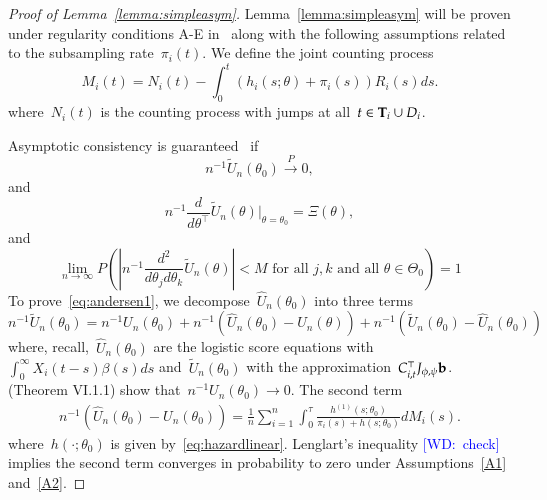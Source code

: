 \documentclass[12pt]{amsart}
\newcommand{\walt}[1]{\textcolor{blue}{[WD:\ #1]}}
\def\bfT{{\bf T}}
\begin{document}
\begin{proof}[Proof of Lemma~\ref{lemma:simpleasym}]
Lemma~\ref{lemma:simpleasym} will be proven under regularity
conditions A-E in~\cite[pp. 420--421]{Andersen1993} along with the
following assumptions related to the subsampling rate~$\pi_i (t)$.
We define the joint counting process
\[
M_i (t) = N_i (t) - \int_0^t (h_i (s; \theta) + \pi_i (s)) R_i (s) ds. 
\]
where~$N_i (t)$ is the counting process with jumps at all~$t \in
\bfT_i \cup D_i$.

Asymptotic consistency is guaranteed~\cite[Theorem VI.1.1]{Andersen1993} if
\begin{equation}
\label{eq:andersen1}
n^{-1} \tilde U_n (\theta_0 ) \overset{P}{\to} 0,
\end{equation}
and 
\begin{equation}
\label{eq:andersen2}
n^{-1} \frac{d}{d \theta^{\top}} \tilde U_n (\theta) \big |_{\theta =
  \theta_0} = \Xi (\theta),
\end{equation}
and
\begin{equation}
\label{eq:andersen3}
\lim_{n \to \infty} P \left( \left | n^{-1} \frac{d^2}{d \theta_j d
      \theta_k} \tilde U_n (\theta) \right | < M \text{ for all }
  j,k \text{ and all } \theta \in \Theta_0 \right) = 1
\end{equation}
To prove~\eqref{eq:andersen1}, we decompose~$\hat U_n (\theta_0)$ into
three terms
\[
n^{-1} \tilde U_n (\theta_0) = n^{-1} U_n (\theta_0 )  + n^{-1} \left(
  \hat U_n (\theta_0) - U_n (\theta) \right) + n^{-1} \left(\tilde U_n
  (\theta_0) - \hat U_n (\theta_0) \right)
\]
where, recall,~$\hat U_n (\theta_0)$ are the logistic score equations
with $\int_0^\infty X_i(t-s) \beta(s) ds$ and~$\tilde U_n (\theta_0)$
with the approximation~$C_{i,t}^\top J_{\phi, \psi} {\bf b}$. 
\cite{Andersen1993} (Theorem VI.1.1) show that~$n^{-1} U_n (\theta_0)
\to 0$. The second term
\begin{align*}
n^{-1} \left( \hat U_n (\theta_0) - U_n (\theta_0) \right) =
  \frac{1}{n} \sum_{i=1}^n \int_0^{\tau} \frac{h^{(1)} (s;
  \theta_0)}{\pi_i (s) + h (s;\theta_0)} d M_i (s). 
\end{align*}
where~$h(\cdot; \theta_0)$ is given by~\eqref{eq:hazardlinear}.
Lenglart's inequality \walt{check} implies the second term converges
in probability to zero under Assumptions~\ref{A1} and~\ref{A2}.


\end{proof}
\end{document}
